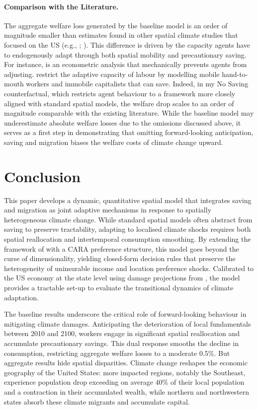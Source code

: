 \documentclass[12pt, a4paper]{article}
\begin{document}
\paragraph{Comparison with the Literature.}
The aggregate welfare loss generated by the baseline model is an order of magnitude smaller than estimates found in other spatial climate studies that focused on the US (e.g., \citet{hsiang_estimating_2017}; \citet{bilal_anticipating_nodate}). This difference is driven by the capacity agents have to endogenously adapt through both spatial mobility and precautionary saving. For instance, \citet{hsiang_estimating_2017} is an econometric analysis that mechanically prevents agents from adjusting. \citet{bilal_anticipating_nodate} restrict the adaptive capacity of labour by modelling mobile hand-to-mouth workers and immobile capitalists that can save. Indeed, in my No Saving counterfactual, which restricts agent behaviour to a framework more closely aligned with standard spatial models, the welfare drop scales to an order of magnitude comparable with the existing literature. While the baseline model may underestimate absolute welfare losses due to the omissions discussed above, it serves as a first step in demonstrating that omitting forward-looking anticipation, saving and migration biases the welfare costs of climate change upward.

\section{Conclusion}

This paper develops a dynamic, quantitative spatial model that integrates saving and migration as joint adaptive mechanisms in response to spatially heterogeneous climate change. While standard spatial models often abstract from saving to preserve tractability, adapting to localised climate shocks requires both spatial reallocation and intertemporal consumption smoothing. By extending the framework of \citet{dvorkin_geography_2025} with a CARA preference structure, this model goes beyond the curse of dimensionality, yielding closed-form decision rules that preserve the heterogeneity of uninsurable income and location preference shocks. Calibrated to the US economy at the state level using damage projections from \citet{hsiang_estimating_2017}, the model provides a tractable set-up to evaluate the transitional dynamics of climate adaptation.

The baseline results underscore the critical role of forward-looking behaviour in mitigating climate damages. Anticipating the deterioration of local fundamentals between 2010 and 2100, workers engage in significant spatial reallocation and accumulate precautionary savings. This dual response smooths the decline in consumption, restricting aggregate welfare losses to a moderate 0.5\%. But aggregate results hide spatial disparities. Climate change reshapes the economic geography of the United States: more impacted regions, notably the Southeast, experience population drop exceeding on average 40\% of their local population and a contraction in their accumulated wealth, while northern and northwestern states absorb these climate migrants and accumulate capital. 
\end{document}
